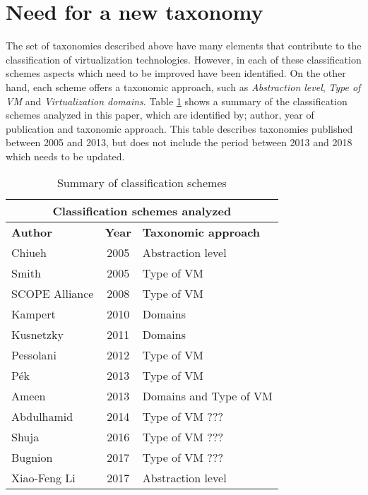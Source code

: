 	\section {Need for a new taxonomy}\label{sec:necesidadDeUnaTaxonomia}
	
	The set of taxonomies described above have many elements that contribute to the classification of virtualization technologies. However, in each of these classification schemes aspects which need to be improved have been identified. On the other hand, each scheme offers a taxonomic approach, such as \textit{Abstraction level}, \textit{Type of VM} and \textit{Virtualization domains}. Table \ref{cuadro:resumenTrabajos} shows a summary of the classification schemes analyzed in this paper, which are identified by; author, year of publication and taxonomic approach. This table describes taxonomies published between 2005 and 2013, but does not include the period between 2013 and 2018 which needs to be updated.
	
	
	\begin{table}[htbp]
		\centering
		\begin{tabular}{|l|c|l|}
			\hline
			\multicolumn{3}{|c|}{\textbf{Classification schemes analyzed}}\\
			\hline
			\textbf{Author} & \textbf{Year} & \textbf{Taxonomic approach} \\ 
			\hline
			Chiueh & 2005 & Abstraction level\\ 
			\hline
			Smith& 2005 & Type of VM\\ 
			\hline
			SCOPE Alliance & 2008 & Type of VM\\ 
			\hline
			Kampert & 2010 & Domains\\ 
			\hline
			Kusnetzky & 2011 & Domains\\ 
			\hline
			Pessolani & 2012 & Type of VM\\ 
			\hline
			Pék & 2013 & Type of VM\\ 
			\hline
			Ameen & 2013 & Domains and Type of VM\\ 
			\hline
			Abdulhamid & 2014 & Type of VM ???\\ 
			\hline
			Shuja & 2016 & Type of VM ???\\ 
			\hline
			Bugnion & 2017 & Type of VM ???\\ 
			\hline
			Xiao-Feng Li & 2017 & Abstraction level\\ 
			\hline
		\end{tabular}
		\caption{Summary of classification schemes}
		\label{cuadro:resumenTrabajos}
	\end{table}


